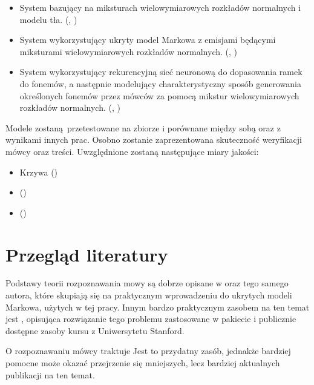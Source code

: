 \begin{itemize}
    \item System bazujący na miksturach wielowymiarowych rozkładów normalnych i modelu tła. (, )
    \item System wykorzystujący ukryty model Markowa z emisjami będącymi miksturami wielowymiarowych rozkładów normalnych. (, )
    \item System wykorzystujący rekurencyjną sieć neuronową do dopasowania ramek do fonemów, a następnie modelujący charakterystyczny sposób generowania określonych fonemów przez mówców za pomocą mikstur wielowymiarowych rozkładów normalnych. (, )
\end{itemize}

Modele zostaną przetestowane na zbiorze  i porównane między sobą oraz z wynikami innych prac.
Osobno zostanie zaprezentowana skuteczność weryfikacji mówcy oraz treści. Uwzględnione zostaną następujące miary jakości:

\begin{itemize}
    \item Krzywa  ()
    \item {} ()
    \item {} ()
\end{itemize}

\section{Przegląd literatury}\label{sec:przeglad_literatury}

Podstawy teorii rozpoznawania mowy są dobrze opisane w \cite{fundamentalsOfSpeech}
oraz \cite{aTutorialOnHidden} tego samego autora, które skupiają się na praktycznym wprowadzeniu
do ukrytych modeli Markowa, użytych w tej pracy.
Innym bardzo praktycznym zasobem na ten temat jest \cite{theHtkBook}, opisująca rozwiązanie
tego problemu zastosowane w pakiecie  i publicznie dostępne zasoby
kursu  z Uniwersytetu Stanford.

O rozpoznawaniu mówcy traktuje \cite{fundamentalsOfSpeaker}
Jest to przydatny zasób, jednakże bardziej pomocne może okazać przejrzenie się mniejszych, lecz
bardziej aktualnych publikacji na ten temat.

